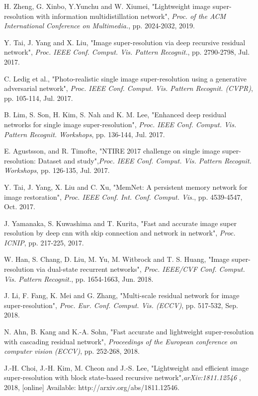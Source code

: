 \documentclass{ieeeaccess}
\begin{document}
\begin{thebibliography}{00}
 H. Zheng, G. Xinbo, Y.Yunchu and W. Xiumei, "Lightweight image super-resolution with information multidistillation network", \textit{Proc. of the ACM International Conference on Multimedia.}, pp. 2024-2032, 2019.


 Y. Tai, J. Yang and X. Liu, "Image super-resolution via deep recursive residual network", \textit{Proc. IEEE Conf. Comput. Vis. Pattern Recognit.}, pp. 2790-2798, Jul. 2017.



 C. Ledig et al., "Photo-realistic single image super-resolution using a generative adversarial network", \textit{Proc. IEEE Conf. Comput. Vis. Pattern Recognit. (CVPR)}, pp. 105-114, Jul. 2017.


 B. Lim, S. Son, H. Kim, S. Nah and K. M. Lee, "Enhanced deep residual networks for single image super-resolution", \textit{Proc. IEEE Conf. Comput. Vis. Pattern Recognit. Workshops}, pp. 136-144, Jul. 2017.


 E. Agustsson, and R. Timofte, "NTIRE 2017 challenge on single image super-resolution: Dataset and study",\textit{Proc. IEEE Conf. Comput. Vis. Pattern Recognit. Workshops}, pp. 126-135, Jul. 2017.


 Y. Tai, J. Yang, X. Liu and C. Xu, "MemNet: A persistent memory network for image restoration", \textit{Proc. IEEE Conf. Int. Conf. Comput. Vis.}, pp. 4539-4547, Oct. 2017.


 J. Yamanaka, S. Kuwashima and T. Kurita, "Fast and accurate image super resolution by deep cnn with skip connection and network in network", \textit{Proc. ICNIP}, pp. 217-225, 2017.


 W. Han, S. Chang, D. Liu, M. Yu, M. Witbrock and T. S. Huang, "Image super-resolution via dual-state recurrent networks", \textit{Proc. IEEE/CVF Conf. Comput. Vis. Pattern Recognit.}, pp. 1654-1663, Jun. 2018.


 J. Li, F. Fang, K. Mei and G. Zhang, "Multi-scale residual network for image super-resolution", \textit{Proc. Eur. Conf. Comput. Vis. (ECCV)}, pp. 517-532, Sep. 2018.


 N. Ahn, B. Kang and K.-A. Sohn, "Fast accurate and lightweight super-resolution with cascading residual network", \textit{ Proceedings of the European conference on computer vision (ECCV)}, pp. 252-268, 2018.


 J.-H. Choi, J.-H. Kim, M. Cheon and J.-S. Lee, "Lightweight and efficient image super-resolution with block state-based recursive network",\textit{arXiv:1811.12546} , 2018, [online] Available: http://arxiv.org/abs/1811.12546.



\end{thebibliography}
\end{document}
